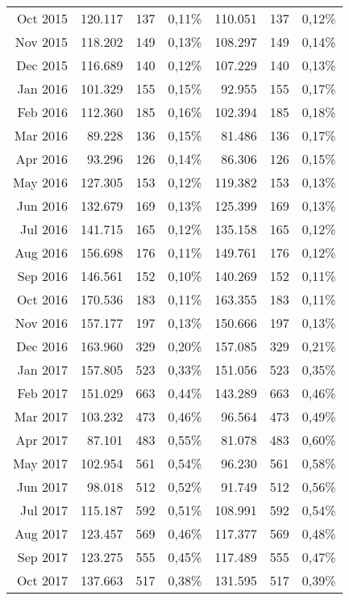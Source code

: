 \begin{longtable}{r|rrr|rrr}
Oct 2015 & 120.117 & 137   & 0,11\% & 110.051 & 137   & 0,12\% \\
Nov 2015 & 118.202 & 149   & 0,13\% & 108.297 & 149   & 0,14\% \\
Dec 2015 & 116.689 & 140   & 0,12\% & 107.229 & 140   & 0,13\% \\
Jan 2016 & 101.329 & 155   & 0,15\% & 92.955  & 155   & 0,17\% \\
Feb 2016 & 112.360 & 185   & 0,16\% & 102.394 & 185   & 0,18\% \\
Mar 2016 & 89.228  & 136   & 0,15\% & 81.486  & 136   & 0,17\% \\
Apr 2016 & 93.296  & 126   & 0,14\% & 86.306  & 126   & 0,15\% \\
May 2016 & 127.305 & 153   & 0,12\% & 119.382 & 153   & 0,13\% \\
Jun 2016 & 132.679 & 169   & 0,13\% & 125.399 & 169   & 0,13\% \\
Jul 2016 & 141.715 & 165   & 0,12\% & 135.158 & 165   & 0,12\% \\
Aug 2016 & 156.698 & 176   & 0,11\% & 149.761 & 176   & 0,12\% \\
Sep 2016 & 146.561 & 152   & 0,10\% & 140.269 & 152   & 0,11\% \\
Oct 2016 & 170.536 & 183   & 0,11\% & 163.355 & 183   & 0,11\% \\
Nov 2016 & 157.177 & 197   & 0,13\% & 150.666 & 197   & 0,13\% \\
Dec 2016 & 163.960 & 329   & 0,20\% & 157.085 & 329   & 0,21\% \\
Jan 2017 & 157.805 & 523   & 0,33\% & 151.056 & 523   & 0,35\% \\
Feb 2017 & 151.029 & 663   & 0,44\% & 143.289 & 663   & 0,46\% \\
Mar 2017 & 103.232 & 473   & 0,46\% & 96.564  & 473   & 0,49\% \\
Apr 2017 & 87.101  & 483   & 0,55\% & 81.078  & 483   & 0,60\% \\
May 2017 & 102.954 & 561   & 0,54\% & 96.230  & 561   & 0,58\% \\
Jun 2017 & 98.018  & 512   & 0,52\% & 91.749  & 512   & 0,56\% \\
Jul 2017 & 115.187 & 592   & 0,51\% & 108.991 & 592   & 0,54\% \\
Aug 2017 & 123.457 & 569   & 0,46\% & 117.377 & 569   & 0,48\% \\
Sep 2017 & 123.275 & 555   & 0,45\% & 117.489 & 555   & 0,47\% \\
Oct 2017 & 137.663 & 517   & 0,38\% & 131.595 & 517   & 0,39\% \\

\end{longtable}
